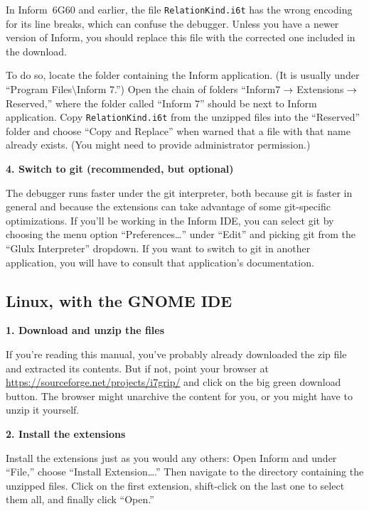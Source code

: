 \documentclass{book}
\newcommand{\lastpagebreak}{\vfill\pagebreak}
\newcommand{\nil}{{\null}}
\newcommand{\thento}{\(\nil\rightarrow\nil\)}
\begin{document}
In Inform~6G60 and earlier, the file \texttt{RelationKind.i6t} has the wrong
encoding for its line breaks, which can confuse the debugger.  Unless you have a
newer version of Inform, you should replace this file with the corrected one
included in the download.

To do so, locate the folder containing the Inform application.  (It is
usually under ``Program Files\(\mathord{\setminus}\)Inform 7.'')  Open
the chain of folders ``Inform7\thento Extensions\thento Reserved,''
where the folder called ``Inform 7'' should be next to Inform
application.  Copy \texttt{RelationKind.i6t} from the unzipped files
into the ``Reserved'' folder and choose ``Copy and Replace'' when
warned that a file with that name already exists.  (You might need to
provide administrator permission.)

\textbf{4. Switch to git (recommended, but optional)}

The debugger runs faster under the git interpreter, both because git
is faster in general and because the extensions can take advantage of
some git-specific optimizations.  If you'll be working in the Inform
IDE, you can select git by choosing the menu option
``Preferences\dots'' under ``Edit'' and picking git from the ``Glulx
Interpreter'' dropdown.  If you want to switch to git in another
application, you will have to consult that application's
documentation.

\lastpagebreak

\subsection{Linux, with the GNOME IDE}

\textbf{1. Download and unzip the files}

If you're reading this manual, you've probably already downloaded the zip file
and extracted its contents.  But if not, point your browser at
\url{https://sourceforge.net/projects/i7grip/} and click on the big green
download button.  The browser might unarchive the content for you, or you might
have to unzip it yourself.

\textbf{2. Install the extensions}

Install the extensions just as you would any others: Open Inform and under
``File,'' choose ``Install Extension\dots.''  Then navigate to the directory
containing the unzipped files.  Click on the first extension, shift-click on the
last one to select them all, and finally click ``Open.''
\end{document}
